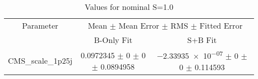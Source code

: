 \begin{table}
\centering
\caption{Values for nominal S=1.0}
\begin{tabular}{ccc}
\toprule
Parameter & \multicolumn{2}{c}{Mean $\pm$ Mean Error $\pm$ RMS $\pm$ Fitted Error}\\
 & B-Only Fit & S+B Fit\\
\midrule
CMS\_scale\_1p25j & \num{0.0972345} $\pm$ \num{0} $\pm$ \num{0} $\pm$ \num{0.0894958} & \num{-2.33935e-07} $\pm$ \num{0} $\pm$ \num{0} $\pm$ \num{0.114593}\\
\bottomrule
\end{tabular}
\end{table}